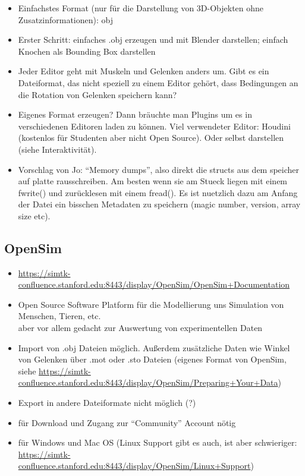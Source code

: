 \begin{itemize}
 \item Einfachstes Format (nur für die Darstellung von 3D-Objekten ohne Zusatzinformationen): obj
 \item Erster Schritt: einfaches .obj erzeugen und mit Blender darstellen; einfach Knochen als Bounding Box darstellen
 \item Jeder Editor geht mit Muskeln und Gelenken anders um. Gibt es ein Dateiformat, das nicht speziell zu einem Editor gehört, dass Bedingungen an die Rotation von Gelenken speichern kann?
 \item Eigenes Format erzeugen? Dann bräuchte man Plugins um es in verschiedenen Editoren laden zu können. Viel verwendeter Editor: Houdini (kostenlos für Studenten aber nicht Open Source). Oder selbst darstellen (siehe Interaktivität).
\item Vorschlag von Jo: "`Memory dumps"', also direkt die structs aus dem speicher auf platte rausschreiben. Am besten wenn sie am Stueck liegen mit einem fwrite() und zurücklesen mit einem fread(). Es ist nuetzlich dazu am Anfang der Datei ein bisschen Metadaten zu speichern (magic number, version, array size etc).
\end{itemize}

\subsection{OpenSim}

\begin{itemize}
 \item \url{https://simtk-confluence.stanford.edu:8443/display/OpenSim/OpenSim+Documentation}
 \item Open Source Software Platform für die Modellierung uns Simulation von Menschen, Tieren, etc.\\
 aber vor allem gedacht zur Auswertung von experimentellen Daten
 \item Import von .obj Dateien möglich. Außerdem zusätzliche Daten wie Winkel von Gelenken über .mot oder .sto Dateien (eigenes Format von OpenSim, siehe \url{https://simtk-confluence.stanford.edu:8443/display/OpenSim/Preparing+Your+Data})
 \item Export in andere Dateiformate nicht möglich (?)
 \item für Download und Zugang zur "`Community"' Account nötig
 \item für Windows und Mac OS (Linux Support gibt es auch, ist aber schwieriger: \url{https://simtk-confluence.stanford.edu:8443/display/OpenSim/Linux+Support})
\end{itemize}


